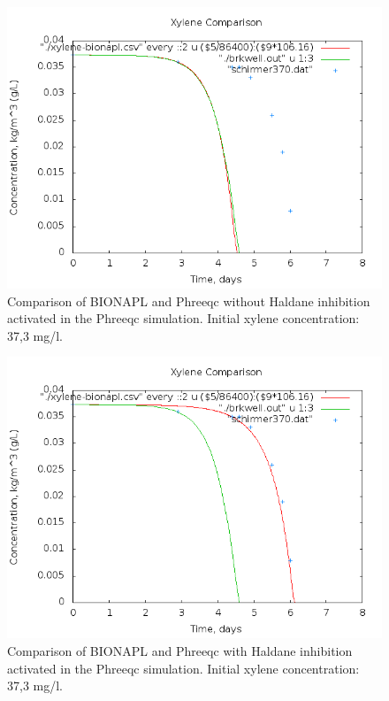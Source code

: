 \documentclass[12pt,twoside]{report}
\begin{document}
\begin{figure}[h]
\includegraphics[width=14cm]{img/comp-xylene37nohaldane.png}
\caption{Comparison of BIONAPL and Phreeqc without Haldane inhibition activated in the Phreeqc simulation. Initial xylene concentration: 37,3 mg/l.}
\label{3}
\end{figure}


\begin{figure}[h]
\includegraphics[width=14cm]{img/comp-xylene37haldane.png}
\caption{Comparison of BIONAPL and Phreeqc with Haldane inhibition activated in the Phreeqc simulation. Initial xylene concentration: 37,3 mg/l.}
\label{4}
\end{figure}
\end{document}
